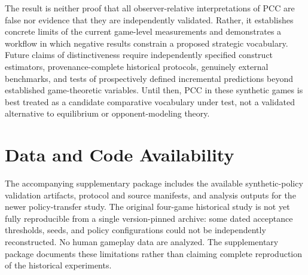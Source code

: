 \documentclass[journal]{IEEEtran}
\begin{document}
The result is neither proof that all observer-relative interpretations of PCC are false nor evidence that they are independently validated. Rather, it establishes concrete limits of the current game-level measurements and demonstrates a workflow in which negative results constrain a proposed strategic vocabulary. Future claims of distinctiveness require independently specified construct estimators, provenance-complete historical protocols, genuinely external benchmarks, and tests of prospectively defined incremental predictions beyond established game-theoretic variables. Until then, PCC in these synthetic games is best treated as a candidate comparative vocabulary under test, not a validated alternative to equilibrium or opponent-modeling theory.

\section*{Data and Code Availability}
The accompanying supplementary package includes the available synthetic-policy validation artifacts, protocol and source manifests, and analysis outputs for the newer policy-transfer study. The original four-game historical study is not yet fully reproducible from a single version-pinned archive: some dated acceptance thresholds, seeds, and policy configurations could not be independently reconstructed. No human gameplay data are analyzed. The supplementary package documents these limitations rather than claiming complete reproduction of the historical experiments.
\end{document}
